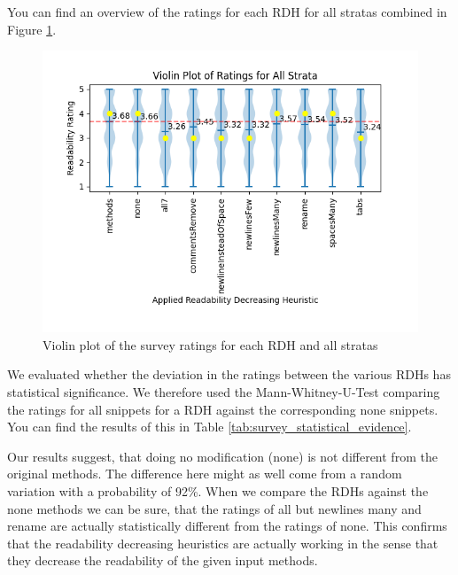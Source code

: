 \documentclass[%
class=scrreprt,
chapterprefix=false,%
open=right,%
twoside=false,%
paper=a4,%
logofile={Logo\_zentral\_farbig\_EN.png},%
thesistype=master,%
UKenglish,%
]{se2thesis}
\begin{document}
	You can find an overview of the ratings for each RDH for all stratas combined in Figure \ref{fig:survey_ratings_violin_all}.

	\begin{figure}[t]
		\centering
		\includegraphics[width=\textwidth]{img/survey_ratings_violin_all.png}
		\caption{Violin plot of the survey ratings for each RDH and all stratas}
		\label{fig:survey_ratings_violin_all}
	\end{figure}
	
	We evaluated whether the deviation in the ratings between the various RDHs has statistical significance. We therefore used the Mann-Whitney-U-Test comparing the ratings for all snippets for a RDH against the corresponding none snippets. You can find the results of this in Table \ref{tab:survey_statistical_evidence}.
	
	Our results suggest, that doing no modification (none) is not different from the original methods. The difference here might as well come from a random variation with a probability of 92\%. When we compare the RDHs against the none methods we can be sure, that the ratings of all but newlines many and rename are actually statistically different from the ratings of none. This confirms that the readability decreasing heuristics are actually working in the sense that they decrease the readability of the given input methods.
		
\end{document}
